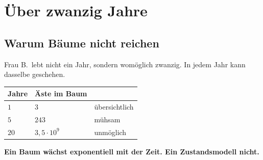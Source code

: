 \chapter{Über zwanzig Jahre}

\section{Warum Bäume nicht reichen}

\begin{merksatz}
Frau B.\ lebt nicht ein Jahr, sondern womöglich zwanzig. In jedem Jahr kann dasselbe geschehen.

\begin{center}
{\small
\renewcommand{\arraystretch}{1.48}
\begin{tabular}{@{}P{2.4cm}P{2.6cm}P{2.8cm}@{}}
\toprule
\textbf{Jahre} & \textbf{Äste im Baum} & \\
\midrule
$1$ & $3$ & übersichtlich\\
$5$ & $243$ & mühsam\\
$20$ & $3{,}5\cdot10^{9}$ & \textcolor{akzent}{unmöglich}\\
\bottomrule
\end{tabular}}
\end{center}

\begin{center}
\begin{minipage}{0.9\textwidth}
\textbf{Ein Baum wächst exponentiell mit der Zeit. Ein Zustandsmodell nicht.}
\end{minipage}
\end{center}
\end{merksatz}

